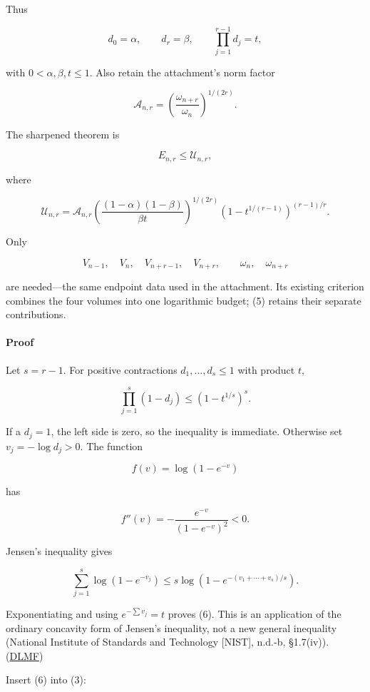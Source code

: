 Thus

\[
d_0=\alpha,\qquad d_r=\beta,\qquad
\prod_{j=1}^{r-1}d_j=t,
\]

with \(0<\alpha,\beta,t\le1\). Also retain the attachment's norm factor

\[
\mathcal A_{n,r}
=
\left(\frac{\omega_{n+r}}{\omega_n}\right)^{1/(2r)}.
\]

The sharpened theorem is

\[
\boxed{
E_{n,r}\le\mathcal U_{n,r},
}
\tag{4}
\]

where

\[
\boxed{
\mathcal U_{n,r}
=
\mathcal A_{n,r}
\left(
\frac{(1-\alpha)(1-\beta)}{\beta t}
\right)^{1/(2r)}
\left(1-t^{1/(r-1)}\right)^{(r-1)/r}.
}
\tag{5}
\]

Only

\[
V_{n-1},\quad V_n,\quad V_{n+r-1},\quad V_{n+r},
\qquad
\omega_n,\quad\omega_{n+r}
\]

are needed---the same endpoint data used in the attachment. Its existing criterion combines the four volumes into one logarithmic budget; (5) retains their separate contributions.

\paragraph{Proof}\label{endpoint-user_product_original--proof}

Let \(s=r-1\). For positive contractions \(d_1,\ldots,d_s\le1\) with product \(t\),

\[
\boxed{
\prod_{j=1}^{s}(1-d_j)
\le
(1-t^{1/s})^s.
}
\tag{6}
\]

If a \(d_j=1\), the left side is zero, so the inequality is immediate. Otherwise set \(v_j=-\log d_j>0\). The function

\[
f(v)=\log(1-e^{-v})
\]

has

\[
f''(v)=-\frac{e^{-v}}{(1-e^{-v})^2}<0.
\]

Jensen's inequality gives

\[
\sum_{j=1}^{s}\log(1-e^{-v_j})
\le
s\log\left(1-e^{-(v_1+\cdots+v_s)/s}\right).
\]

Exponentiating and using \(e^{-\sum v_j}=t\) proves (6). This is an application of the ordinary concavity form of Jensen's inequality, not a new general inequality (National Institute of Standards and Technology {[}NIST{]}, n.d.-b, §1.7(iv)). (\href{https://dlmf.nist.gov/1.7?utm_source=chatgpt.com}{DLMF})

Insert (6) into (3):

